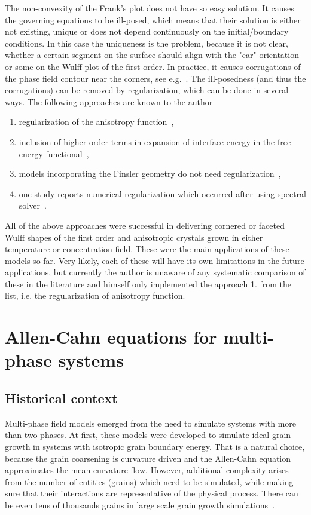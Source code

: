 	The non-convexity of the Frank's plot does not have so easy solution. It causes the governing equations to be ill-posed, which means that their solution is either not existing, unique or does not depend continuously on the initial/boundary conditions. In this case the uniqueness is the problem, because it is not clear, whether a certain segment on the surface should align with the "ear" orientation or some on the Wulff plot of the first order. In practice, it causes corrugations of the phase field contour near the corners, see e.g.~\cite{Tschukin2017}. The ill-posedness (and thus the corrugations) can be removed by regularization, which can be done in several ways. The following approaches are known to the author
	\begin{enumerate}
		\item regularization of the anisotropy function~\cite{Taylor1998,Eggleston2001,Kobayashi2001},
		\item inclusion of higher order terms in expansion of interface energy in the free energy functional~\cite{Wheeler2006, Torabi2009, Tschukin2017},
		\item models incorporating the Finsler geometry do not need regularization~\cite{Bellettini1996,Benes2003},
		\item one study reports numerical regularization which occurred after using spectral solver~\cite{Toth2015}.
	\end{enumerate}
	All of the above approaches were successful in delivering cornered or faceted Wulff shapes of the first order and anisotropic crystals grown in either temperature or concentration field. These were the main applications of these models so far. Very likely, each of these will have its own limitations in the future applications, but currently the author is unaware of any systematic comparison of these in the literature and himself only implemented the approach 1. from the list, i.e. the regularization of anisotropy function.

\section{Allen-Cahn equations for multi-phase systems}
	\subsection{Historical context}
	Multi-phase field models emerged from the need to simulate systems with more than two phases. At first, these models were developed to simulate ideal grain growth in systems with isotropic grain boundary energy. That is a natural choice, because the grain coarsening is curvature driven and the Allen-Cahn equation approximates the mean curvature flow. However, additional complexity arises from the number of entities (grains) which need to be simulated, while making sure that their interactions are representative of the physical process. There can be even tens of thousands grains in large scale grain growth simulations~\cite{Yadav2018}.
	
